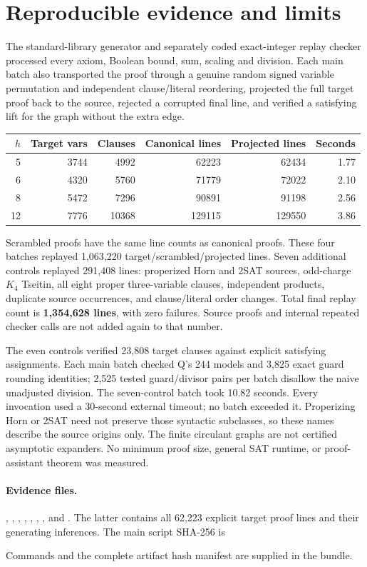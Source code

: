\documentclass[11pt]{article}
\begin{document}
\section{Reproducible evidence and limits}
The standard-library generator and separately coded exact-integer replay
checker processed every axiom, Boolean bound, sum, scaling and division.
Each main batch also transported the proof through a genuine random signed
variable permutation and independent clause/literal reordering, projected
the full target proof back to the source, rejected a corrupted final line,
and verified a satisfying lift for the graph without the extra edge.
\begin{center}\small
\begin{tabular}{rrrrrr}
\toprule
$h$ & Target vars & Clauses & Canonical lines & Projected lines & Seconds\\
\midrule
5 &3744&4992&62223&62434&1.77\\
6 &4320&5760&71779&72022&2.10\\
8 &5472&7296&90891&91198&2.56\\
12&7776&10368&129115&129550&3.86\\
\bottomrule
\end{tabular}
\end{center}
Scrambled proofs have the same line counts as canonical proofs. These four
batches replayed 1,063,220 target/scrambled/projected lines. Seven additional
controls replayed 291,408 lines: properized Horn and 2SAT sources, odd-charge
$K_4$ Tseitin, all eight proper three-variable clauses, independent products,
duplicate source occurrences, and clause/literal order changes. Total final
replay count is \textbf{1,354,628 lines}, with zero failures. Source proofs
and internal repeated checker calls are not added again to that number.

The even controls verified 23,808 target clauses against explicit satisfying
assignments. Each main batch checked Q's 244 models and 3,825 exact guard
rounding identities; 2,525 tested guard/divisor pairs per batch disallow the
naive unadjusted division. The seven-control batch took 10.82 seconds. Every
invocation used a 30-second external timeout; no batch exceeded it.
Properizing Horn or 2SAT need not preserve those syntactic subclasses, so
these names describe the source origins only. The finite circulant graphs
are not certified asymptotic expanders. No minimum proof size, general SAT
runtime, or proof-assistant theorem was measured.

\paragraph{Evidence files.}
, , ,
, , , , and
. The latter contains all 62,223 explicit target
proof lines and their generating inferences. The main script SHA-256 is
\begin{center}\small\ttfamily
{}
\end{center}
Commands and the complete artifact hash manifest are supplied in the bundle.
\end{document}
